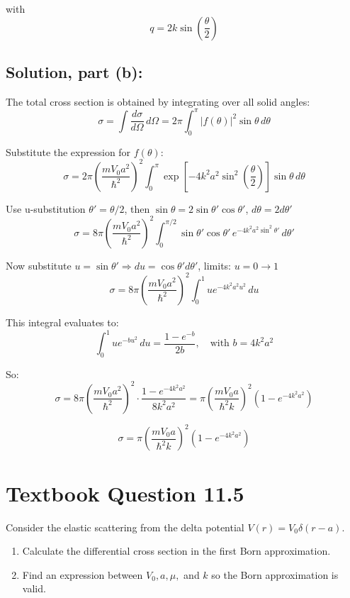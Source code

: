 \documentclass[12pt]{article}
\begin{document}
        with 
        \[
            q = 2k \sin\left( \frac{\theta}{2} \right) 
        \]

    \subsection{Solution, part (b):}
        The total cross section is obtained by integrating over all solid angles:
        \[
            \sigma = \int \frac{d\sigma}{d\Omega} \, d\Omega = 2\pi \int_0^\pi \left| f(\theta) \right|^2 \sin\theta \, d\theta
        \]
        
        Substitute the expression for \( f(\theta) \):
        \[
            \sigma = 2\pi \left( \frac{m V_0 a^2}{\hbar^2} \right)^2 \int_0^\pi \exp\left[ -4k^2 a^2 \sin^2\left( \frac{\theta}{2} \right) \right] \sin\theta \, d\theta
        \]
        
        Use u-substitution \( \theta' = \theta/2 \), then \( \sin\theta = 2\sin\theta' \cos\theta' \), \( d\theta = 2 d\theta' \)
        \[
            \sigma = 8\pi \left( \frac{m V_0 a^2}{\hbar^2} \right)^2 \int_0^{\pi/2} \sin\theta' \cos\theta' \, e^{-4k^2 a^2 \sin^2\theta'} \, d\theta'
        \]
        
        Now substitute \( u = \sin\theta' \Rightarrow du = \cos\theta' d\theta' \), limits: \( u = 0 \to 1 \)
        \[
            \sigma = 8\pi \left( \frac{m V_0 a^2}{\hbar^2} \right)^2 \int_0^1 u e^{-4k^2 a^2 u^2} \, du
        \]
        
        This integral evaluates to:
        \[
            \int_0^1 u e^{-bu^2} \, du = \frac{1 - e^{-b}}{2b}, \quad \text{with } b = 4k^2 a^2
        \]
        
        So:
        \[
            \sigma = 8\pi \left( \frac{m V_0 a^2}{\hbar^2} \right)^2 \cdot \frac{1 - e^{-4k^2 a^2}}{8k^2 a^2}
            = \pi \left( \frac{m V_0 a}{\hbar^2 k} \right)^2 \left( 1 - e^{-4k^2 a^2} \right)
        \]
        
        \[
            \boxed{\sigma = \pi \left( \frac{m V_0 a}{\hbar^2 k} \right)^2 \left( 1 - e^{-4k^2 a^2} \right)}
        \]


\section{Textbook Question 11.5}
    Consider the elastic scattering from the delta potential \( V(r) = V_0 \delta(r - a) \).
    
    \begin{enumerate}
        \item[(a)] Calculate the differential cross section in the first Born approximation.
        \item[(b)] Find an expression between \( V_0, a, \mu, \) and \( k \) so the Born approximation is valid.
    \end{enumerate}
\end{document}
